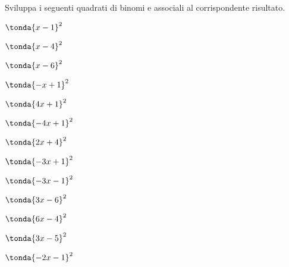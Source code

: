 \begin{esercizio}
\label{ese:11.4}
Sviluppa i seguenti quadrati di binomi e associali al corrispondente 
risultato.
\begin{htmulticols}{4}
\begin{enumeratea}
\spazielenx
\item \(\tonda{x - 1}^{2}\) %
\item \(\tonda{x - 4}^{2}\) %
\item \(\tonda{x - 6}^{2}\) %
\item \(\tonda{- x + 1}^{2}\) %
\item \(\tonda{4 x + 1}^{2}\) %
\item \(\tonda{-4 x + 1}^{2}\) %
\item \(\tonda{2 x + 4}^{2}\) %
\item \(\tonda{- 3 x + 1}^{2}\) %
\item \(\tonda{- 3 x - 1}^{2}\) %
\item \(\tonda{3 x - 6}^{2}\) %
\item \(\tonda{6 x - 4}^{2}\) %
\item \(\tonda{3 x - 5}^{2}\) %
\item \(\tonda{- 2 x - 1}^{2}\) %

\end{enumeratea}
\end{htmulticols}
\end{esercizio}
